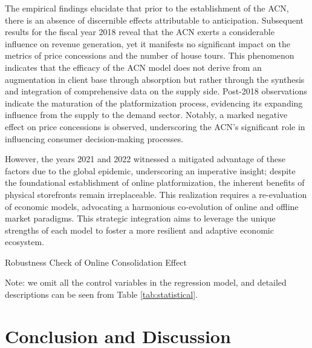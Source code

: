 \documentclass[12pt]{article}
\begin{document}
The empirical findings elucidate that prior to the establishment of the ACN, there is an absence of discernible effects attributable to anticipation. Subsequent results for the fiscal year 2018 reveal that the ACN exerts a considerable influence on revenue generation, yet it manifests no significant impact on the metrics of price concessions and the number of house tours. This phenomenon indicates that the efficacy of the ACN model does not derive from an augmentation in client base through absorption but rather through the synthesis and integration of comprehensive data on the supply side. Post-2018 observations indicate the maturation of the platformization process, evidencing its expanding influence from the supply to the demand sector. Notably, a marked negative effect on price concessions is observed, underscoring the ACN's significant role in influencing consumer decision-making processes.

However, the years 2021 and 2022 witnessed a mitigated advantage of these factors due to the global epidemic, underscoring an imperative insight; despite the foundational establishment of online platformization, the inherent benefits of physical storefronts remain irreplaceable. This realization requires a re-evaluation of economic models, advocating a harmonious co-evolution of online and offline market paradigms. This strategic integration aims to leverage the unique strengths of each model to foster a more resilient and adaptive economic ecosystem.

\begin{table}
  \begin{center}
    \begin{scriptsize}
      \caption{Robustness Check of Online Consolidation Effect}
      \label{tab:heter_platform_did}
      
    
    Note: we omit all the control variables in the regression model, and detailed descriptions can be seen from Table \ref{tab:statistical}.
    \end{scriptsize}
  \end{center}
\end{table}

\section{Conclusion and Discussion} \label{sec:conclusion}
\end{document}
